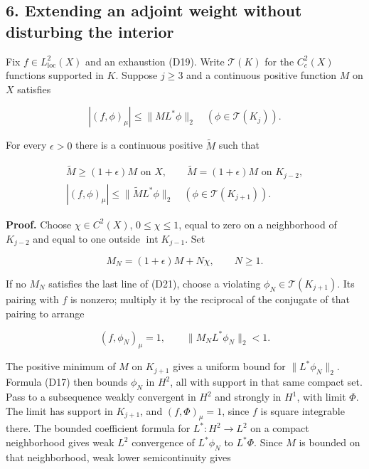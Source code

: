 \documentclass[
  11pt,
]{article}
\begin{document}
\subsection{6. Extending an adjoint weight without disturbing the
interior}\label{extending-an-adjoint-weight-without-disturbing-the-interior}

Fix \(f\in L^2_{\mathrm{loc}}(X)\) and an exhaustion (D19). Write
\(\mathcal T(K)\) for the \(C_c^2(X)\) functions supported in \(K\).
Suppose \(j\geq3\) and a continuous positive function \(M\) on \(X\)
satisfies

\[
                    |(f,\phi)_\mu|\leq\|ML^*\phi\|_2
                          \quad(\phi\in\mathcal T(K_j)).         \tag{D20}
\]

For every \(\epsilon>0\) there is a continuous positive \(\widetilde M\)
such that

\[
 \begin{gathered}
 \widetilde M\geq(1+\epsilon)M\text{ on }X,
 \qquad \widetilde M=(1+\epsilon)M\text{ on }K_{j-2},\\
 |(f,\phi)_\mu|\leq\|\widetilde M L^*\phi\|_2
                          \quad(\phi\in\mathcal T(K_{j+1})).
 \end{gathered}                                                   \tag{D21}
\]

\textbf{Proof.} Choose \(\chi\in C^2(X)\), \(0\leq\chi\leq1\), equal to
zero on a neighborhood of \(K_{j-2}\) and equal to one outside
\(\operatorname{int}K_{j-1}\). Set

\[
                      M_N=(1+\epsilon)M+N\chi,\qquad N\geq1.    \tag{D22}
\]

If no \(M_N\) satisfies the last line of (D21), choose a violating
\(\phi_N\in\mathcal T(K_{j+1})\). Its pairing with \(f\) is nonzero;
multiply it by the reciprocal of the conjugate of that pairing to
arrange

\[
 (f,\phi_N)_\mu=1,\qquad \|M_NL^*\phi_N\|_2<1.                 \tag{D23}
\]

The positive minimum of \(M\) on \(K_{j+1}\) gives a uniform bound for
\(\|L^*\phi_N\|_2\). Formula (D17) then bounds \(\phi_N\) in \(H^2\),
all with support in that same compact set. Pass to a subsequence weakly
convergent in \(H^2\) and strongly in \(H^1\), with limit \(\Phi\). The
limit has support in \(K_{j+1}\), and \((f,\Phi)_\mu=1\), since \(f\) is
square integrable there. The bounded coefficient formula for
\(L^*:H^2\to L^2\) on a compact neighborhood gives weak \(L^2\)
convergence of \(L^*\phi_N\) to \(L^*\Phi\). Since \(M\) is bounded on
that neighborhood, weak lower semicontinuity gives
\end{document}
